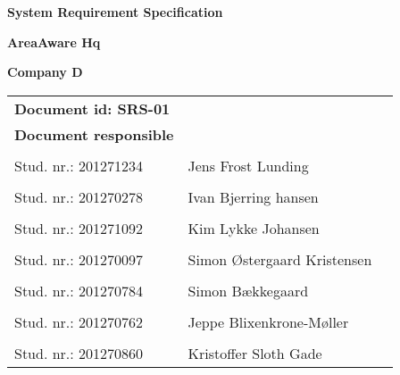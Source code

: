 
\centerline{\Huge\bfseries\color{ThemeColor} System Requirement Specification } 

\vspace{1em}
\centerline{\Large\bfseries\color{BlackColor} AreaAware Hq} 

\vspace{5em}
\centerline{\large\bfseries\color{BlackColor}Company D} 




\begin{center}
	\begin{tabular}{ l l p{6cm} }
		\textbf{Document id: SRS-01}& & \\
		\textbf{Document responsible}& & \\
		& & \\
		Stud. nr.: 201271234 & Jens Frost Lunding & \\\hline
		& & \\
		Stud. nr.: 201270278 & Ivan Bjerring hansen & \\\hline
		& & \\
		Stud. nr.: 201271092 & Kim Lykke Johansen & \\\hline
		& & \\	
		Stud. nr.: 201270097 & Simon Østergaard Kristensen & \\\hline
		& & \\
		Stud. nr.: 201270784  & Simon Bækkegaard & \\\hline
		& & \\
		Stud. nr.: 	201270762 & Jeppe Blixenkrone-Møller & \\\hline
		& & \\
		Stud. nr.: 	201270860 & Kristoffer Sloth Gade & \\\hline
	\end{tabular}     	
\end{center}
\thispagestyle{empty} %
\restoregeometry



		